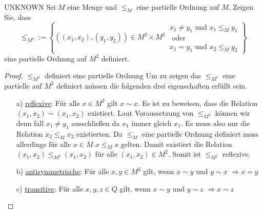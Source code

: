 \documentclass{problemset}
\begin{document}
\begin{problem}{UNKNOWN}
Sei $M$ eine Menge und $\le_{M}$ eine partielle Ordnung auf $M$. Zeigen Sie, dass \[
    \le_{M^2} := \left\{((x_1,x_2), (y_1,y_2))\in M^2 \times M^2\ \begin{array}{|ccc}
        x_1 \neq y_1 \text{ und } x_1 \le_{M} y_1 \\
        \text{ oder }                             \\
        x_1 = y_1 \text{ und } x_2 \le_{M} y_2
    \end{array} \right\}
\] eine partielle Ordnung auf $M^2$ definiert.
\begin{proof} $\le_{M^2}$ definiert eine partielle Ordnung \newline
    Um zu zeigen das $\le_{M^2}$ eine partielle auf $M^2$ definiert müssen die folgenden drei eigenschaften erfüllt sein.
    \begin{enumerate}
        \item [a)] \underline{reflexive}: Für alle $x \in M^2$ gilt $x \sim x$. \newline
              Es ist zu beweisen, dass die Relation $(x_1, x_2) \sim (x_1, x_2)$ existiert.
              Laut Voraussetzung von $\le_{M^2}$ können wir denn fall $x_1 \neq y_1$ ausschließen da $x_1$ immer gleich $x_1$.
              Es muss also nur die Relation $x_2 \le_M x_2$ existierten.
              Da $\le_M$ eine partielle Ordnung definiert muss allerdings für alle $x \in M$ $x \le_M x$ gelten.
              Damit existiert die Relation $(x_1, x_2) \le_{M^2} (x_1, x_2)$ für alle $(x_1,x_2) \in M^2$.
              \newline\newline
              Somit ist $\le_{M^2}$ reflexive.
        \item [b)] \underline{antisymmetrische}: Für alle $x, y \in M^2$ gilt, wenn $x \sim y$ und $y \sim x$ $\Rightarrow x = y$ \newline
        \item [c)] \underline{transitive}: Für alle $x,y,z \in Q$ gilt, wenn $x \sim y$ und $y \sim z$ $\Rightarrow x \sim z$ \newline
    \end{enumerate}
\end{proof}
\end{problem}
\end{document}
